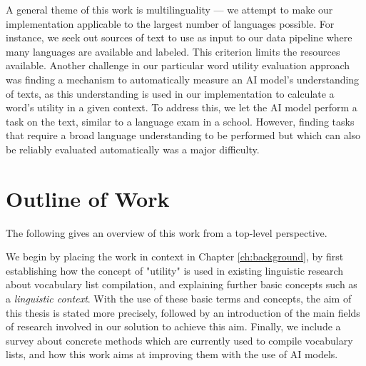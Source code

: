 A general theme of this work is multilinguality --- we attempt to make our implementation applicable to the largest number of languages possible.
For instance, we seek out sources of text to use as input to our data pipeline where many languages are available and labeled.
This criterion limits the resources available.
Another challenge in our particular word utility evaluation approach was finding a mechanism to automatically measure an AI model's understanding of texts, as this understanding is used in our implementation to calculate a word's utility in a given context.
To address this, we let the AI model perform a task on the text, similar to a language exam in a school.
However, finding tasks that require a broad language understanding to be performed but which can also be reliably evaluated automatically was a major difficulty.




\section{Outline of Work} \label{sec:outline-of-work}

The following gives an overview of this work from a top-level perspective.

We begin by placing the work in context in Chapter \ref{ch:background}, by first establishing how the concept of "utility" is used in existing linguistic research about vocabulary list compilation, and explaining further basic concepts such as a \textit{linguistic context}.
With the use of these basic terms and concepts, the aim of this thesis is stated more precisely, followed by an introduction of the main fields of research involved in our solution to achieve this aim.
Finally, we include a survey about concrete methods which are currently used to compile vocabulary lists, and how this work aims at improving them with the use of AI models.

